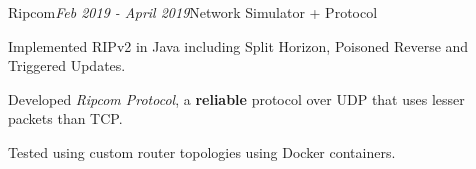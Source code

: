 \begin{rSubsection}{Ripcom}{\em Feb 2019 - April 2019}{Network Simulator + Protocol}{}
    \item Implemented RIPv2 in Java including Split Horizon, Poisoned Reverse and Triggered Updates.
    \item Developed \textit{Ripcom Protocol}, a \textbf{reliable} protocol over UDP that uses lesser packets than TCP.
    \item Tested using custom router topologies using Docker containers.
\end{rSubsection}
